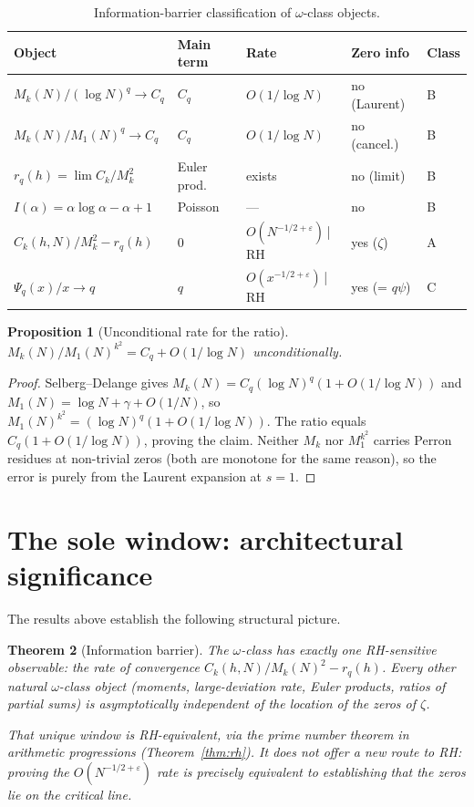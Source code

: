 \documentclass[11pt]{amsart}
\newtheorem{theorem}{Theorem}[section]
\newtheorem{proposition}[theorem]{Proposition}
\theoremstyle{definition}
\theoremstyle{remark}
\newcommand{\om}{\omega}
\begin{document}
\begin{table}[h]
\centering
\begin{tabular}{lllll}
\hline
Object & Main term & Rate & Zero info & Class \\
\hline
$M_k(N)/(\log N)^q \to C_q$ & $C_q$ & $O(1/\log N)$ & no (Laurent) & B \\
$M_k(N)/M_1(N)^q \to C_q$ & $C_q$ & $O(1/\log N)$ & no (cancel.) & B \\
$r_q(h)=\lim C_k/M_k^2$ & Euler prod. & exists & no (limit) & B \\
$I(\alpha)=\alpha\log\alpha-\alpha+1$ & Poisson & --- & no & B \\
$C_k(h,N)/M_k^2 - r_q(h)$ & 0 & $O(N^{-1/2+\varepsilon})$\,|\,RH & yes ($\zeta$) & A \\
$\Psi_q(x)/x \to q$ & $q$ & $O(x^{-1/2+\varepsilon})$\,|\,RH & yes (= $q\psi$) & C \\
\hline
\end{tabular}
\caption{Information-barrier classification of $\om$-class objects.}
\label{tab:info}
\end{table}

\begin{proposition}[Unconditional rate for the ratio]\label{prop:ratio}
  $M_k(N)/M_1(N)^{k^2} = C_q + O(1/\log N)$ unconditionally.
\end{proposition}
\begin{proof}
  Selberg--Delange gives $M_k(N) = C_q(\log N)^q(1+O(1/\log N))$ and
  $M_1(N) = \log N + \gamma + O(1/N)$, so
  $M_1(N)^{k^2} = (\log N)^q(1+O(1/\log N))$.
  The ratio equals $C_q(1+O(1/\log N))$, proving the claim.
  Neither $M_k$ nor $M_1^{k^2}$ carries Perron residues at non-trivial zeros
  (both are monotone for the same reason), so the error is purely from the
  Laurent expansion at $s=1$.
\end{proof}

\section{The sole window: architectural significance}
\label{sec:architecture}

The results above establish the following structural picture.

\begin{theorem}[Information barrier]\label{thm:barrier}
  The $\om$-class has exactly one RH-sensitive observable: the rate of convergence
  $C_k(h,N)/M_k(N)^2 - r_q(h)$.  Every other natural $\om$-class object
  (moments, large-deviation rate, Euler products, ratios of partial sums)
  is asymptotically independent of the location of the zeros of $\zeta$.

  That unique window is RH-equivalent, via the prime number theorem in arithmetic
  progressions (Theorem~\ref{thm:rh}).  It does not offer a new route to RH:
  proving the $O(N^{-1/2+\varepsilon})$ rate is precisely equivalent to establishing
  that the zeros lie on the critical line.
\end{theorem}
\end{document}
